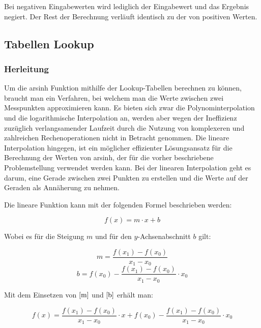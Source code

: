 \documentclass[course=erap]{aspdoc}
\begin{document}
Bei negativen Eingabewerten wird lediglich der Eingabewert und das Ergebnis negiert. Der Rest der Berechnung verläuft identisch zu der von positiven Werten.
    
 \subsection{Tabellen Lookup}
 \subsubsection{Herleitung}
    Um die arsinh Funktion mithilfe der Lookup-Tabellen berechnen zu können, braucht man ein Verfahren, bei welchem man die Werte zwischen zwei Messpunkten approximieren kann. Es bieten sich zwar die Polynominterpolation und die logarithmische Interpolation an, werden aber wegen der Ineffizienz zuzüglich verlangsamender Laufzeit durch die Nutzung von komplexeren und zahlreichen Rechenoperationen nicht in Betracht genommen. Die lineare Interpolation hingegen, ist ein möglicher effizienter Lösungsansatz für die Berechnung der Werten von arsinh, der für die vorher beschriebene Problemstellung verwendet werden kann.
    Bei der linearen Interpolation geht es darum, eine Gerade zwischen zwei Punkten zu erstellen und die Werte auf der Geraden als Annäherung zu nehmen.
    
    Die lineare Funktion kann mit der folgenden Formel beschrieben werden: 

    \begin{equation}
        f(x) = m\cdot x + b
    \end{equation}

    Wobei es für die Steigung $m$ und für den $y$-Achsenabschnitt $b$ gilt:
    
    \begin{equation}\label{m}
        m = \frac{f(x_1) - f(x_0)}{x_1 - x_0} 
    \end{equation}
    \begin{equation}\label{b}
        b = f(x_0) - \frac{f(x_1) - f(x_0)}{x_1 - x_0} \cdot x_0
    \end{equation}

    Mit dem Einsetzen von $\eqref{m}$ und $\eqref{b}$ erhält man:
    
    \begin{equation}
        f(x) = \frac{f(x_1) - f(x_0)}{x_1 - x_0} \cdot x + f(x_0) - \frac{f(x_1) - f(x_0)}{x_1 - x_0} \cdot x_0
    \end{equation}
    
\end{document}

